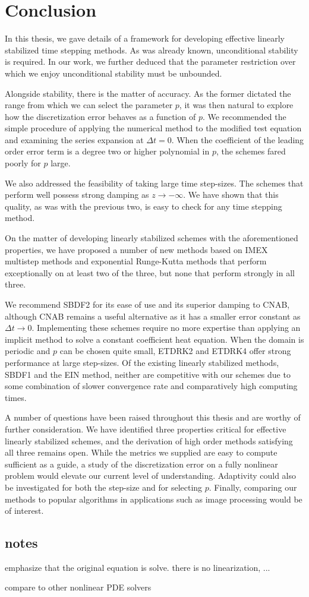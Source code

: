 \chapter{Conclusion}
In this thesis, we gave details of a framework for developing effective linearly stabilized time stepping methods. As was already known, unconditional stability is required. In our work, we further deduced that the parameter restriction over which we enjoy unconditional stability must be unbounded. 

Alongside stability, there is the matter of accuracy. As the former dictated the range from which we can select the parameter $p$, it was then natural to explore how the discretization error behaves as a function of $p$. We recommended the simple procedure of applying the numerical method to the modified test equation and examining the series expansion at $\Delta t = 0$. When the coefficient of the leading order error term is a degree two or higher polynomial in $p$, the schemes fared poorly for $p$ large.

We also addressed the feasibility of taking large time step-sizes. The schemes that perform well possess strong damping as $z\to-\infty$. We have shown that this quality, as was with the previous two, is easy to check for any time stepping method.

On the matter of developing linearly stabilized schemes with the aforementioned properties, we have proposed a number of new methods based on IMEX multistep methods and exponential Runge-Kutta methods that perform exceptionally on at least two of the three, but none that perform strongly in all three.

We recommend SBDF2 for its ease of use and its superior damping to CNAB, although CNAB remains a useful alternative as it has a smaller error constant as $\Delta t \to 0$. Implementing these schemes require no more expertise than applying an implicit method to solve a constant coefficient heat equation. 
When the domain is periodic and  $p$ can be chosen quite small, ETDRK2 and ETDRK4 offer strong performance at large step-sizes.
Of the existing linearly stabilized methods, SBDF1 and the EIN method, neither are competitive with our schemes due to some combination of slower convergence rate and comparatively high computing times.

A number of questions have been raised throughout this thesis and are worthy of further consideration. We have identified three properties critical for effective linearly stabilized schemes, and the derivation of high order methods satisfying all three remains open. While the metrics we supplied are easy to compute sufficient as a guide, a study of the discretization error on a fully nonlinear problem would elevate our current level of understanding. Adaptivity could also be investigated for both the step-size and for selecting $p$. Finally, comparing our methods to popular algorithms in applications such as image processing would be of interest.

\section*{notes}
emphasize that the original equation is solve. there is no linearization, ...

compare to other nonlinear PDE solvers